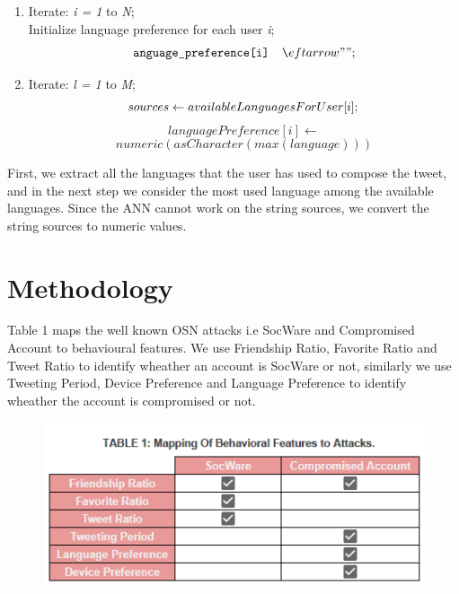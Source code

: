 \documentclass[conference]{IEEEtran}
\begin{document}
\begin{enumerate}
	\item Iterate: \textit{i = 1} to \textit{N}; \\
	Initialize language preference  for each user \textit{i};
	\begin{equation*}
		\verb language_preference[i]  \leftarrow " ";
	\end{equation*}
	\item Iterate: \textit{l = 1} to \textit{M};
		\begin{equation*}
			sources  \leftarrow \\availableLanguagesForUser[i]; \\
		\end{equation*}
		\begin{equation*}
			languagePreference[i]  \leftarrow
		\end{equation*}	
		\begin{equation*}
			numeric( asCharacter( max( language )))
		\end{equation*}	
		
		
\end{enumerate} 
First, we extract all the languages that the user has used to compose the tweet, 
and in the next step we consider the most used language among the available languages. 
Since the ANN cannot work on the string sources, we convert the string sources to numeric values.


\section{Methodology}


Table 1 maps the well known OSN attacks i.e SocWare and Compromised Account to behavioural features\cite{11}. 
We use Friendship Ratio, Favorite Ratio and Tweet Ratio to identify wheather an account is SocWare or not, similarly we use Tweeting Period, 
Device Preference and Language Preference to identify wheather the account is compromised or not.

\begin{figure}[h!]
	\includegraphics[scale=0.7]{attack_types1}
\end{figure}
\end{document}
